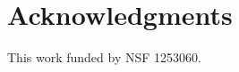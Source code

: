 \documentclass[10pt,letterpaper]{article}
\begin{document}

\section*{Acknowledgments}
This work funded by NSF 1253060.

\nolinenumbers



\end{document}
